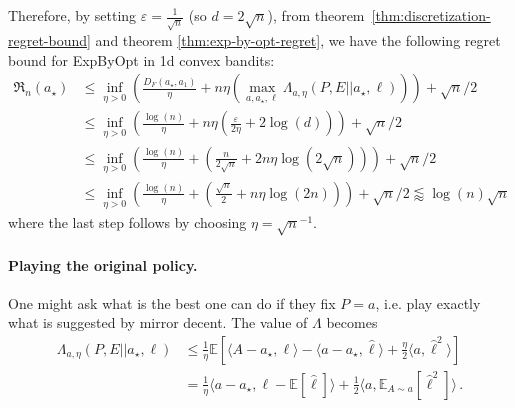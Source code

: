 \documentclass{article}
\theoremstyle{plain}
\theoremstyle{definition}
\renewcommand{\epsilon}{\varepsilon}
\newcommand{\Reg}{\mathfrak{R}}
\newcommand{\E}{\mathbb E}
\newcommand{\expbyopt}{\textsf{ExpByOpt}\xspace}
\newcommand{\hl}{\hat{\ell}\xspace}
\begin{document}
Therefore, by setting $\epsilon = \frac{1}{\sqrt{n}}$ (so $d = 2 \sqrt{n}$),
from theorem~\ref{thm:discretization-regret-bound} and theorem \ref{thm:exp-by-opt-regret},
we have the following regret bound for \expbyopt in 1d convex bandits:
\begin{align*}
    \Reg_n(a_\star)
     & \leq
    \inf_{\eta > 0}
    \left(
    \frac{D_F(a_\star, a_1)}{\eta}
    +
    n \eta
    \left(
        \max_{a, a_\star, \ell}
        \Lambda_{a, \eta}(P, E || a_\star, \ell)
        \right)
    \right)
    + \sqrt{n} /2
    \\
     & \leq
    \inf_{\eta > 0}
    \left(
    \frac{\log(n)}{\eta}
    +
    n \eta
    \left(
        \frac{\epsilon}{2 \eta}
        +
        2 \log(d)
        \right)
    \right)
    + \sqrt{n} /2
    \\
     & \leq
    \inf_{\eta > 0}
    \left(
    \frac{\log(n)}{\eta}
    +
    \left(
        \frac{n}{2 \sqrt{n}}
        +
        2 n \eta \log(2\sqrt{n})
        \right)
    \right)
    + \sqrt{n} /2
    \\
     & \leq
    \inf_{\eta > 0}
    \left(
    \frac{\log(n)}{\eta}
    +
    \left(
        \frac{\sqrt{n}}{2 }
        +
        n \eta \log(2n)
        \right)
    \right)
    + \sqrt{n} /2
    \lessapprox
    \log(n) \sqrt{n}
    \,
\end{align*}
where the last step follows by choosing $\eta = \sqrt{n}^{-1}$.


\paragraph{Playing the original policy.}
One might ask what is the best one can do if they fix $P = a$,
i.e. play exactly what is suggested by mirror decent.
The value of $\Lambda$ becomes
\begin{align*}
    \Lambda_{a, \eta}(P, E || a_\star, \ell)
     & \leq
    \frac{1}{\eta}
    \E\!\left[
        \langle A - a_\star, \ell \rangle
        - \langle a - a_\star, \hl \rangle
        + \frac{\eta}{2} \langle a, \hl^2 \rangle
        \right]
    \\
     & =
    \frac{1}{\eta}
    \langle a - a_\star, \ell - \E[\hl] \rangle
    + \frac{1}{2}
    \langle a,
    \E_{A \sim a}\!
    \left[\hl^2\right] \rangle\,.
\end{align*}
\end{document}
